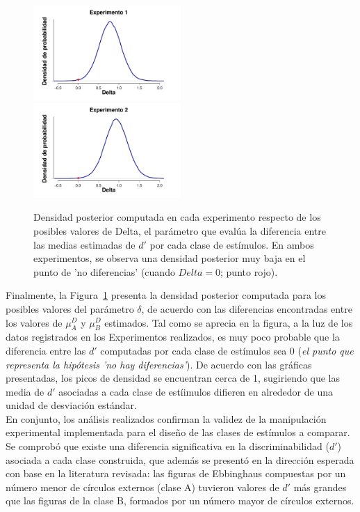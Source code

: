 \begin{figure}[h]
\centering
\includegraphics[width=0.5\textwidth]{Figures/MDelta_DensidadDelta_E1} \includegraphics[width=0.5\textwidth]{Figures/MDelta_DensidadDelta_E2}\\
\decoRule
\caption[Modelo Delta: Densidad posterior de los valores estimados para el parámetro Delta en cada Experimento]{Densidad posterior computada en cada experimento respecto de los posibles valores de Delta, el parámetro que evalúa la diferencia entre las medias estimadas de $d'$ por cada clase de estímulos. En ambos experimentos, se observa una densidad posterior muy baja en el punto de 'no diferencias' (cuando $Delta=0$; punto rojo).} 
\label{fig:Delta}
\end{figure}

Finalmente, la Figura~\ref{fig:Delta} presenta la densidad posterior computada para los posibles valores del parámetro $\delta$, de acuerdo con las diferencias encontradas entre los valores de $\mu^D_A$ y $\mu^D_B$ estimados. Tal como se aprecia en la figura, a la luz de los datos registrados en los Experimentos realizados, es muy poco probable que la diferencia entre las $d'$ computadas por cada clase de estímulos sea 0 (\textit{el punto que representa la hipótesis 'no hay diferencias'}). De acuerdo con las gráficas presentadas, los picos de densidad se encuentran cerca de 1, sugiriendo que las media de $d'$ asociadas a cada clase de estíimulos difieren en alrededor de una unidad de desviación estándar.\\

En conjunto, los análisis realizados confirman la validez de la manipulación experimental implementada para el diseño de las clases de estímulos a comparar. Se comprobó que existe una diferencia significativa en la discriminabilidad ($d'$) asociada a cada clase construida, que además se presentó en la dirección esperada con base en la literatura revisada: las figuras de Ebbinghaus compuestas por un número menor de círculos externos (clase A) tuvieron valores de $d'$ más grandes que las figuras de la clase B, formados por un número mayor de círculos externos.\\


